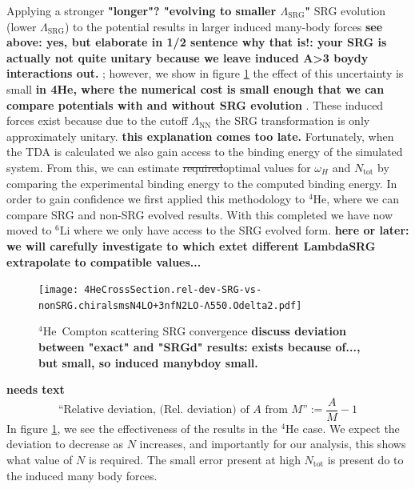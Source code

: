 \documentclass[a4paper,11pt]{article}
\newcommand{\Ntot}{N_{\mathrm{tot}}}
\newcommand{\LamSRG}{\Lambda_{\mathrm{SRG}}}
\newcommand{\LamNN}{\Lambda_{\mathrm{NN}}}
\newcommand{\LiS}{{}^{6} \mathrm{Li} }
\newcommand{\HeF}{{}^{4} \mathrm{He}}
\newcommand{\com}[1]{\color{blue}\small\textbf{ #1 }\color{black}\normalsize}
\newcommand{\replace}[2]{\sout{\protect#1}\color{blue}#2\color{black}}
\begin{document}
Applying a stronger\com{"longer"?  "evolving to smaller $\LamSRG$"} SRG evolution (lower $\LamSRG$) to the potential results in larger
induced many-body forces \com{see above: yes, but elaborate in 1/2 sentence why that is!: your SRG is actually not quite unitary because we leave induced A>3 boydy interactions out.}; however, we show in figure \ref{fig:SRGConverge4He} the
effect of this uncertainty is small \com{in 4He, where the numerical cost is small enough that we can compare potentials with and without SRG evolution}.
These induced forces exist because due to the cutoff $\LamNN$ the SRG transformation
is only approximately unitary. \com{this explanation comes too late.}
Fortunately, when the TDA is calculated we also gain access to the
binding energy of the simulated system.
From this, we can estimate \replace{required}{optimal} values for $\omega_H$ and
$\Ntot$  by comparing the experimental binding energy to the computed
binding energy.
In order to gain confidence we first applied this methodology 
to $\HeF$, where we can compare SRG and non-SRG evolved results. 
With this completed we have now moved to $\LiS$ where we only have access to 
the SRG evolved form. \com{here or later: we will carefully investigate to which extet different LambdaSRG extrapolate to compatible values...}
\begin{figure}[H]
  \begin{center}
    \texttt{[image: 
    4HeCrossSection.rel-dev-SRG-vs-nonSRG.chiralsmsN4LO+3nfN2LO-Λ550.Odelta2.pdf]}
    \caption{$\HeF$\, Compton scattering SRG convergence \com{discuss deviation between "exact" and "SRGd" results: exists because of..., but small, so induced manybdoy small.}}
    \label{fig:SRGConverge4He}
  \end{center}
\end{figure}

\com{needs text}
\begin{equation}
  \text{``Relative deviation, (Rel. deviation) of $A$ from $M$''}:=
  \frac{A}{M}-1
\end{equation}
In figure \ref{fig:SRGConverge4He}, we see the effectiveness of the
results in the $\HeF$ case.
We expect the deviation to decrease as $N$ increases, and importantly
for our analysis, this shows what value of $N$ is required.
The small error present at high $\Ntot$ is present do to the induced many body forces.
\end{document}
